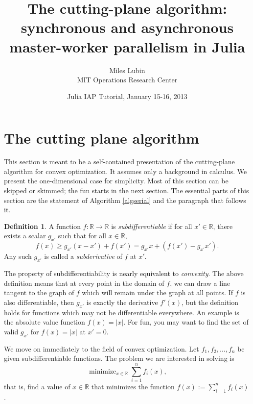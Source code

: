 \documentclass[12pt]{article}
\title{The cutting-plane algorithm: synchronous and asynchronous master-worker parallelism in Julia}
\author{Miles Lubin\\MIT Operations Research Center}
\date{Julia IAP Tutorial, January 15-16, 2013}
\theoremstyle{definition}
\newtheorem*{defn}{Definition}
\begin{document}
\maketitle

\section{The cutting plane algorithm}
This section is meant to be a self-contained presentation of the cutting-plane algorithm for convex optimization. It assumes only a background in calculus. We present the one-dimensional case for simplicity. Most of this section can be skipped or skimmed; the fun starts in the next section. The essential parts of this section are the statement of Algorithm \ref{algserial} and the paragraph that follows it.\nocite{HiriartLemarechal93book2}

\begin{defn}
A function $f : \mathbb{R} \to \mathbb{R}$ is \textit{subdifferentiable} if for all $x' \in \mathbb{R}$, there exists a scalar $g_{x'}$ such that for all $x \in \mathbb{R}$, 
\[
f(x) \ge g_{x'}(x-x') + f(x') = g_{x'}x + (f(x')-g_{x'}x').
\]
Any such $g_{x'}$ is called a \textit{subderivative} of $f$ at $x'$.
\end{defn}
The property of subdifferentiability is nearly equivalent to \textit{convexity}. The above definition means that at every point in the domain of $f$, we can draw a line tangent to the graph of $f$ which will remain under the graph at all points.   If $f$ is also differentiable, then $g_{x'}$ is exactly the derivative $f'(x)$, but the definition holds for functions which may not be differentiable everywhere. An example is the absolute value function $f(x) = |x|$. For fun, you may want to find the set of valid $g_{x'}$ for $f(x) = |x|$ at $x' = 0$.

We move on immediately to the field of convex optimization. Let $f_1,f_2,\ldots,f_n$ be given subdifferentiable functions. The problem we are interested in solving is
\begin{equation}
\operatorname{minimize}_{x \in \mathbb{R}} \sum_{i=1}^n f_i(x),
\end{equation}
that is, find a value of $x \in \mathbb{R}$ that minimizes the function $f(x) := \sum_{i=1}^n f_i(x)$.
\end{document}
